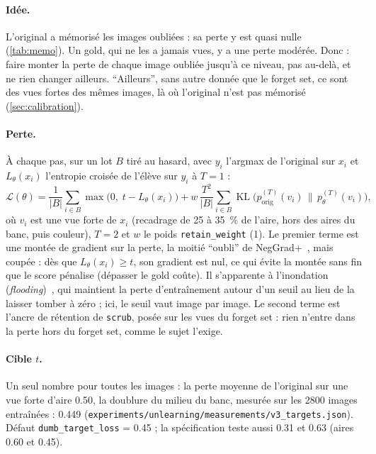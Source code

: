 \documentclass[11pt,a4paper]{article}
\newcommand{\KL}{\operatorname{KL}}
\newcommand{\orig}{\mathrm{orig}}
\newcommand{\code}[1]{\texttt{#1}}
\newcommand{\chemin}[1]{\nolinkurl{#1}}%
\begin{document}
\paragraph{Idée.} L'original a mémorisé les images oubliées : sa perte y est quasi nulle
(\cref{tab:memo}). Un gold, qui ne les a jamais vues, y a une perte modérée. Donc : faire monter la
perte de chaque image oubliée jusqu'à ce niveau, pas au-delà, et ne rien changer ailleurs.
\enquote{Ailleurs}, sans autre donnée que le forget set, ce sont des vues fortes des mêmes images,
là où l'original n'est pas mémorisé (\cref{sec:calibration}).

\paragraph{Perte.} À chaque pas, sur un lot $B$ tiré au hasard, avec $y_i$ l'argmax de l'original
sur $x_i$ et $L_\theta(x_i)$ l'entropie croisée de l'élève sur $y_i$ à $T=1$ :
\begin{equation}
  \mathcal{L}(\theta)=\frac{1}{|B|}\sum_{i\in B}\max\bigl(0,\;t-L_\theta(x_i)\bigr)
  +w\,\frac{T^2}{|B|}\sum_{i\in B}\KL\bigl(p^{(T)}_\orig(v_i)\,\big\|\,p^{(T)}_\theta(v_i)\bigr),
  \label{eq:vdumb}
\end{equation}
où $v_i$ est une vue forte de $x_i$ (recadrage de 25 à \SI{35}{\percent} de l'aire, hors des aires
du banc, puis couleur), $T=2$ et $w$ le poids \code{retain\_weight} (1). Le premier terme est une
montée de gradient sur la perte, la moitié \enquote{oubli} de NegGrad+~\cite{kurmanji2023}, mais
coupée : dès que $L_\theta(x_i)\ge t$, son gradient est nul, ce qui évite la montée sans fin que le
score pénalise (dépasser le gold coûte). Il s'apparente à l'inondation
(\emph{flooding})~\cite{ishida2020}, qui maintient la perte d'entraînement autour d'un seuil au lieu
de la laisser tomber à zéro ; ici, le seuil vaut image par image. Le second terme est l'ancre de
rétention de \code{scrub}, posée sur les vues du forget set : rien n'entre dans la perte hors du
forget set, comme le sujet l'exige.

\paragraph{Cible $t$.} Un seul nombre pour toutes les images : la perte moyenne de l'original sur
une vue forte d'aire \num{0.50}, la doublure du milieu du banc, mesurée sur les 2800 images
entraînées : \num{0.449} (\chemin{experiments/unlearning/measurements/v3_targets.json}). Défaut
\code{dumb\_target\_loss} = \num{0.45} ; la spécification teste aussi \num{0.31} et \num{0.63}
(aires \num{0.60} et \num{0.45}).
\end{document}
